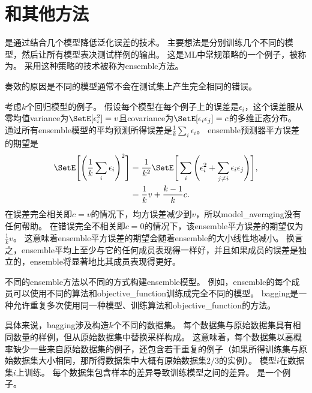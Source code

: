 \section{和其他方法}
\label{sec:bagging_and_other_ensemble_methods}
是通过结合几个模型降低泛化误差的技术\citep{ML:Breiman:bagging}。
主要想法是分别训练几个不同的模型，然后让所有模型表决测试样例的输出。
这是\gls{ML}中常规策略的一个例子，被称为。
采用这种策略的技术被称为\gls{ensemble}方法。

奏效的原因是不同的模型通常不会在测试集上产生完全相同的错误。

考虑$k$个回归模型的例子。
假设每个模型在每个例子上的误差是$\epsilon_i$，这个误差服从零均值\gls{variance}为$\SetE[\epsilon_i^2] = v$且\gls{covariance}为$\SetE[\epsilon_i \epsilon_j] = c$的多维正态分布。
通过所有\gls{ensemble}模型的平均预测所得误差是$\frac{1}{k} \sum_i \epsilon_i$。 
\gls{ensemble}预测器平方误差的期望是
\begin{align}
 \SetE \Bigg[\Bigg(\frac{1}{k} \sum_i \epsilon_i \Bigg)^2\Bigg] &= \frac{1}{k^2} 
 \SetE \Bigg[\sum_i \Bigg(\epsilon_i^2 + \sum_{j \neq i} \epsilon_i \epsilon_j\Bigg)\Bigg], \\
&= \frac{1}{k} v + \frac{k-1}{k} c .                             
\end{align}
在误差完全相关即$c=v$的情况下，均方误差减少到$v$，所以\gls{model_averaging}没有任何帮助。
在错误完全不相关即$c =0$的情况下，该\gls{ensemble}平方误差的期望仅为$\frac{1}{k}v$。
这意味着\gls{ensemble}平方误差的期望会随着\gls{ensemble}的大小线性地减小。
换言之，\gls{ensemble}平均上至少与它的任何成员表现得一样好，并且如果成员的误差是独立的，\gls{ensemble}将显著地比其成员表现得更好。

不同的\gls{ensemble}方法以不同的方式构建\gls{ensemble}模型。
例如，\gls{ensemble}的每个成员可以使用不同的算法和\gls{objective_function}训练成完全不同的模型。
\gls{bagging}是一种允许重复多次使用同一种模型、训练算法和\gls{objective_function}的方法。


具体来说，\gls{bagging}涉及构造$k$个不同的数据集。
每个数据集与原始数据集具有相同数量的样例，但从原始数据集中替换采样构成。
这意味着，每个数据集以高概率缺少一些来自原始数据集的例子，还包含若干重复的例子（如果所得训练集与原始数据集大小相同，那所得数据集中大概有原始数据集$2/3$的实例）。
模型$i$在数据集$i$上训练。
每个数据集包含样本的差异导致训练模型之间的差异。
是一个例子。

